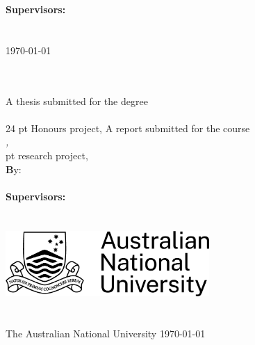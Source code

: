 \noindent
{\footnotesize \bfseries Supervisor\ifTwoOrMoreSupervisors{}s\fi:}\\
{\footnotesize \FirstSupervisor%
\ifTwoOrMoreSupervisors\\\SecondSupervisor\fi}\\[2 em]
\vfill
{\footnotesize \monthyeardate\today}



\else %



\begin{center}
\ \\[1em]
{\bfseries \Huge \ProjectTitle}\\[4em]
%
\ifHonoursThesis%
\Large{A thesis submitted for the degree}\\
\Large{\emph{\Degree}}\\[.5em]
{24 pt Honours project, \Semester{} \Year}
\else%
\Large{A report submitted for the course}\\
\Large{\emph{\CourseCode, \CourseName}}\\[.5em]
{\ProjectPoints{} pt research project, \Semester{} \Year}
\fi
%
\ \\[4em]
{\footnotesize \textbf By:}\\
\textbf{\AuthorName}\\[3em]
%
{\bfseries Supervisor\ifTwoOrMoreSupervisors{}s\fi:}\\
{\FirstSupervisor%
\ifTwoOrMoreSupervisors\\\SecondSupervisor\fi}\\[6em]
%
\includegraphics[height=2.5cm]{figures/ANU-logos/ANU_Primary_Horizontal_Black.jpg}\ \\[3em]
%
{\bfseries \School}\\
{\mdseries \College}\\
The Australian National University
%
\vfill
\normalsize{\monthyeardate\today}
\end{center}



\fi


\restoregeometry
